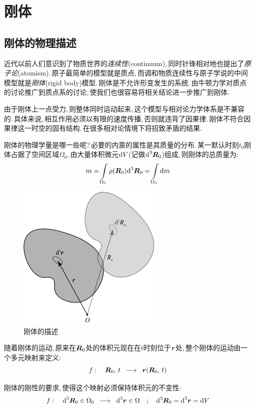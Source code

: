 \chapter{刚体}


\section{刚体的物理描述}
近代以前人们意识到了物质世界的\emph{连续性}(continuum),\,同时针锋相对地也提出了\emph{原子论}(atomism).\,原子最简单的模型就是质点,\,而调和物质连续性与原子学说的中间模型就是\emph{刚体}(rigid body)模型.\,刚体是不允许形变发生的系统.\,由牛顿力学对质点的讨论推广到质点系的讨论,\,使我们也很容易将相关结论进一步推广到刚体.

由于刚体上一点受力,\,则整体同时运动起来,\,这个模型与相对论力学体系是不兼容的.\,具体来说,\,相互作用必须以有限的速度传播,\,否则就违背了因果律.\,刚体不符合因果律这一时空的固有结构.\,在很多相对论情境下将招致矛盾的结果.

刚体的物理学量是哪一些呢?\,必要的内禀的属性是其质量的分布.\,某一默认时刻$t_0$刚体占据了空间区域$\Omega_0$,\,由大量体积微元$\textrm{d} V$(记做$\textrm{d}^3\boldsymbol{R}_0$)组成,\,则刚体的总质量为:
\[m=\int\limits_{\Omega_0}\rho(\boldsymbol{R}_0)\textrm{d}^3\boldsymbol{R}_0=\int\limits_{\Omega_0}\textrm{d} m\]

\begin{figure}
\vspace{-0.4cm}
\centering
\includegraphics[width=7cm]{image/6-6-1.png}
\caption{刚体的描述}
\end{figure}
随着刚体的运动,\,原来在$\boldsymbol{R}_0$处的体积元现在在$t$时刻位于$\boldsymbol{r}$处,\,整个刚体的运动由一个多元映射来定义:
\[f:\quad \boldsymbol{R}_0,\,t\;\;\longrightarrow\;\; \boldsymbol{r}(\boldsymbol{R}_0,\,t)\]

刚体的刚性的要求,\,使得这个映射必须保持体积元的不变性:
\[f:\quad \textrm{d}^3\boldsymbol{R}_0\in\Omega_0\;\;\longrightarrow\;\; \textrm{d}^3\boldsymbol{r}\in\Omega \quad ;\quad \textrm{d}^3\boldsymbol{R}_0=\textrm{d}^3\boldsymbol{r}=\textrm{d} V\]

